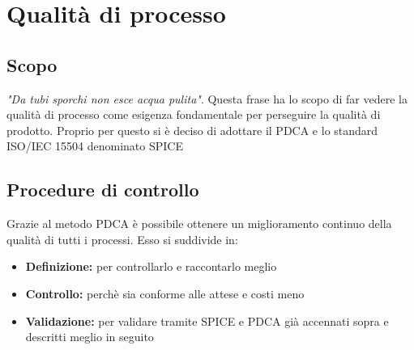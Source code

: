 \section{Qualità di processo}
\subsection{Scopo}
\textit{"Da tubi sporchi non esce acqua pulita"}.\newline
Questa frase ha lo scopo di far vedere la qualità di processo come esigenza fondamentale per perseguire la qualità di prodotto. Proprio per questo si è deciso di adottare il PDCA e lo standard ISO/IEC 15504 denominato SPICE
\subsection{Procedure di controllo}
Grazie al metodo PDCA  è possibile ottenere un miglioramento continuo della qualità di tutti i processi. Esso si suddivide in:
\begin{itemize}
	\item{\textbf{Definizione:} per controllarlo e raccontarlo meglio}
	\item{\textbf{Controllo:} perchè sia conforme alle attese e costi meno}
	\item{\textbf{Validazione:}  per validare tramite SPICE e PDCA già accennati sopra e descritti meglio in seguito}
\end{itemize}
